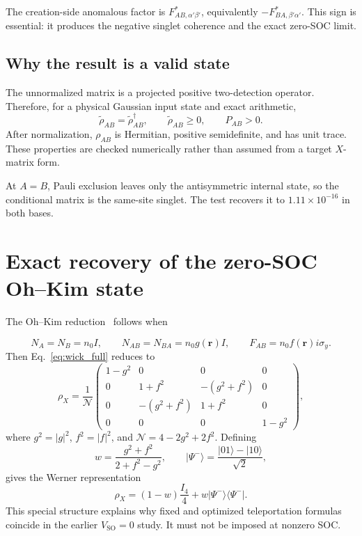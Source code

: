 \documentclass[11pt]{article}
\newcommand{\rr}{\mathbf r}
\begin{document}
The creation-side anomalous factor is $F_{AB,\alpha'\beta'}^*$, equivalently $-F_{BA,\beta'\alpha'}^*$. This sign is essential: it produces the negative singlet coherence and the exact zero-SOC limit.

\subsection{Why the result is a valid state}

The unnormalized matrix is a projected positive two-detection operator. Therefore, for a physical Gaussian input state and exact arithmetic,
\begin{equation}
\widetilde\rho_{AB}=\widetilde\rho_{AB}^{\dagger},
\qquad \widetilde\rho_{AB}\geq0,
\qquad P_{AB}>0.
\end{equation}
After normalization, $\rho_{AB}$ is Hermitian, positive semidefinite, and has unit trace. These properties are checked numerically rather than assumed from a target $X$-matrix form.

At $A=B$, Pauli exclusion leaves only the antisymmetric internal state, so the conditional matrix is the same-site singlet. The test recovers it to $1.11\times10^{-16}$ in both bases.

\section{Exact recovery of the zero-SOC Oh--Kim state}
\label{sec:ohkim_section}

The Oh--Kim reduction~\cite{Oh2005} follows when

\begin{equation}
N_A=N_B=n_0I,\qquad N_{AB}=N_{BA}=n_0g(\rr)I,
\qquad F_{AB}=n_0f(\rr)i\sigma_y.
\end{equation}
Then Eq.~\eqref{eq:wick_full} reduces to
\begin{equation}
\rho_X=\frac1{\mathcal N}
\begin{pmatrix}
1-g^2&0&0&0\\
0&1+f^2&-(g^2+f^2)&0\\
0&-(g^2+f^2)&1+f^2&0\\
0&0&0&1-g^2
\end{pmatrix},
\label{eq:ohkim}
\end{equation}
where $g^2=|g|^2$, $f^2=|f|^2$, and $\mathcal N=4-2g^2+2f^2$. Defining
\begin{equation}
w=\frac{g^2+f^2}{2+f^2-g^2},
\qquad
|\Psi^-\rangle=\frac{|01\rangle-|10\rangle}{\sqrt2},
\end{equation}
gives the Werner representation
\begin{equation}
\rho_X=(1-w)\frac{I_4}{4}+w|\Psi^-\rangle\langle\Psi^-|.
\label{eq:werner}
\end{equation}
This special structure explains why fixed and optimized teleportation formulas coincide in the earlier $V_{\mathrm{SO}}=0$ study. It must not be imposed at nonzero SOC.
\end{document}
